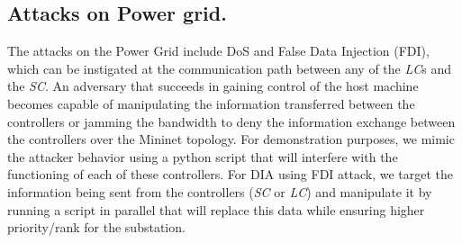 
\subsection{Attacks on Power grid.}
The attacks on the Power Grid  include DoS and False Data Injection (FDI), which can be instigated at the communication path between any of the \textit{LC}s and the \textit{SC}. An adversary that succeeds in gaining control of the host machine becomes capable of manipulating the information transferred between the controllers or jamming the bandwidth to deny the information exchange between the controllers over the Mininet topology.  For demonstration purposes, we mimic the attacker behavior using a python script that will interfere with the functioning of each of these controllers. For DIA using FDI attack, we target the information being sent from the controllers (\textit{SC} or \textit{LC}) and manipulate it by running a script in parallel that will replace this data while ensuring higher priority/rank for the substation.

